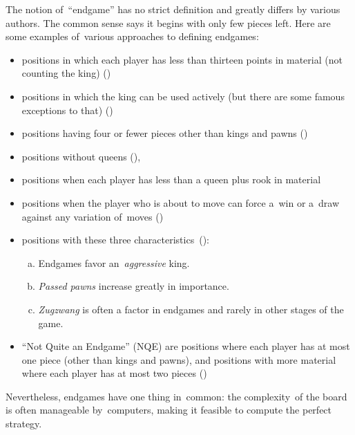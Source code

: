 The notion of~``endgame'' has no strict definition and greatly differs by various authors.
The common sense says it begins with only few pieces left.
Here are some examples of~various approaches to defining endgames:
\begin{itemize}
  \item
    positions in which each player has less than thirteen points in material (not counting the king)
    (\cite[pp.~7--8]{Speelman1981endgame})
    
  \item
    positions in which the king can be used actively (but there are some famous exceptions to that)
    (\cite[pp.~7--8]{Speelman1981endgame})
    
  \item
    positions having four or fewer pieces other than kings and pawns
    (\cite[p.~5]{Minev2004practical})
    
  \item
    positions without queens
    (\cite{Fine1952middle}),
    
  \item
    positions when each player has less than a queen plus rook in material
    
  \item
    positions when the player who is about to move can force a~win or a~draw against any variation of~moves
    (\cite{Portisch1981six})

  \item 
    positions with these three characteristics~(\cite{Alburt1999just}):

    \begin{enumerate}[(a)]
      \item Endgames favor an~\emph{aggressive} king.
      \item \emph{Passed pawns} increase greatly in importance.
      \item \emph{Zugzwang} is often a factor in endgames and rarely in other stages of the game.
    \end{enumerate}

  \item
    ``Not Quite an Endgame'' (NQE) are positions where each player has at most one piece (other than kings and pawns), and positions with more material where each player has at most two pieces
    (\cite[pp.~7--8]{Flear2007practical})
\end{itemize}

Nevertheless, endgames have one thing in~common:
the complexity~of the board is often manageable by~computers, making it feasible to compute the perfect strategy.

